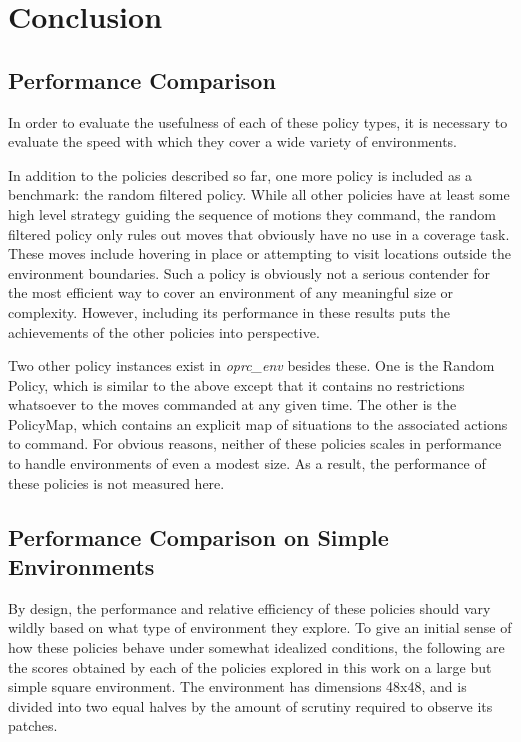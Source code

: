 \chapter{Conclusion}

\section{Performance Comparison}

In order to evaluate the usefulness of each of these policy types, it is necessary to evaluate the speed with which they cover a wide variety of environments.

In addition to the policies described so far, one more policy is included as a benchmark: the random filtered policy. While all other policies have at least some high level strategy guiding the sequence of motions they command, the random filtered policy only rules out moves that obviously have no use in a coverage task. These moves include hovering in place or attempting to visit locations outside the environment boundaries. Such a policy is obviously not a serious contender for the most efficient way to cover an environment of any meaningful size or complexity. However, including its performance in these results puts the achievements of the other policies into perspective.

Two other policy instances exist in \textit{oprc\_env} besides these. One is the Random Policy, which is similar to the above except that it contains no restrictions whatsoever to the moves commanded at any given time. The other is the PolicyMap, which contains an explicit map of situations to the associated actions to command. For obvious reasons, neither of these policies scales in performance to handle environments of even a modest size. As a result, the performance of these policies is not measured here.

\section{Performance Comparison on Simple Environments}

By design, the performance and relative efficiency of these policies should vary wildly based on what type of environment they explore. To give an initial sense of how these policies behave under somewhat idealized conditions, the following are the scores obtained by each of the policies explored in this work on a large but simple square environment. The environment has dimensions 48x48, and is divided into two equal halves by the amount of scrutiny required to observe its patches.

